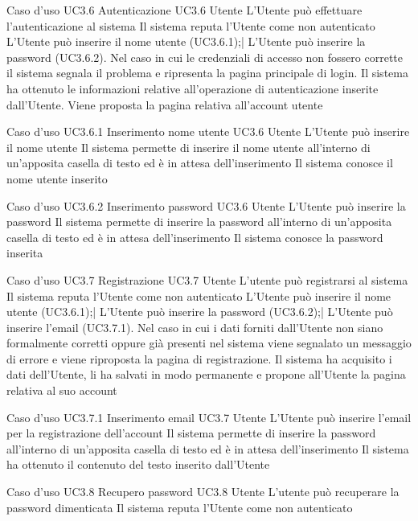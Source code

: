 \UCtitle
{Caso d'uso UC3.6}
{Autenticazione}
\UC
{UC3.6}
{Utente}
{L'Utente può effettuare l'autenticazione al sistema}
{Il sistema reputa l'Utente come non autenticato}
\scenario
{L'Utente può inserire il nome utente (UC3.6.1);|
L'Utente può inserire la password (UC3.6.2).
}
\scenarioAlt
{Nel caso in cui le credenziali di accesso non fossero corrette il sistema segnala il problema e ripresenta la pagina principale di login.
}
\post
{Il sistema ha ottenuto le informazioni relative all'operazione di autenticazione inserite dall'Utente. Viene proposta la pagina relativa all'account utente}


\UCtitle
{Caso d'uso UC3.6.1}
{Inserimento nome utente}
\UC
{UC3.6}
{Utente}
{L'Utente può inserire il nome utente}
{Il sistema permette di inserire il nome utente all'interno di un'apposita casella di testo ed è in attesa dell'inserimento}
\post
{Il sistema conosce il nome utente inserito}

\UCtitle
{Caso d'uso UC3.6.2}
{Inserimento password}
\UC
{UC3.6}
{Utente}
{L'Utente può inserire la password}
{Il sistema permette di inserire la password all'interno di un'apposita casella di testo ed è in attesa dell'inserimento}
\post
{Il sistema conosce la password inserita}

\UCtitle
{Caso d'uso UC3.7}
{Registrazione}
\UC
{UC3.7}
{Utente}
{L'utente può registrarsi al sistema}
{Il sistema reputa l'Utente come non autenticato}
\scenario
{L'Utente può inserire il nome utente (UC3.6.1);|
L'Utente può inserire la password (UC3.6.2);|
L'Utente può inserire l'email (UC3.7.1).
}
\scenarioAlt
{Nel caso in cui i dati forniti dall'Utente non siano formalmente corretti oppure già presenti nel sistema viene segnalato un messaggio di errore e viene riproposta la pagina di registrazione.
}
\post
{Il sistema ha acquisito i dati dell'Utente, li ha salvati in modo permanente e propone all'Utente la pagina relativa al suo account}

\UCtitle
{Caso d'uso UC3.7.1}
{Inserimento email}
\UC
{UC3.7}
{Utente}
{L'Utente può inserire l'email per la registrazione dell'account}
{Il sistema permette di inserire la password all'interno di un'apposita casella di testo ed è in attesa dell'inserimento}
\post
{Il sistema ha ottenuto il contenuto del testo inserito dall'Utente}

\UCtitle
{Caso d'uso UC3.8}
{Recupero password}
\UC
{UC3.8}
{Utente}
{L'utente può recuperare la password dimenticata}
{Il sistema reputa l'Utente come non autenticato}
